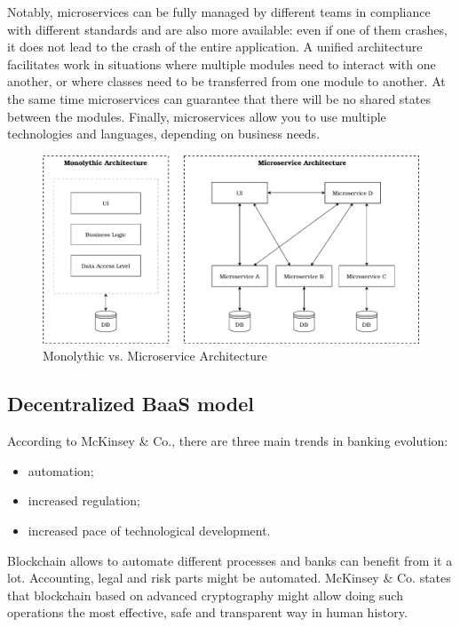 \documentclass{article}
\begin{document}
\begin{multicols}{2}
Notably, microservices can be fully managed by different teams in compliance with different standards and are also more available: even if one of them crashes, it does not lead to the crash of the entire application. A unified architecture facilitates work in situations where multiple modules need to interact with one another, or where classes need to be transferred from one module to another. At the same time microservices can guarantee that there will be no shared states between the modules. Finally, microservices allow you to use multiple technologies and languages, depending on business needs.

\begin{figure}
  \centering
  \includegraphics[width=\textwidth]{microservice-vs-monolyth.pdf}
  \caption{Monolythic vs. Microservice Architecture}
  \label{fig:microservice-vs-monolyth}
\end{figure}

\subsection{Decentralized BaaS model}

According to McKinsey \& Co., there are three main trends in banking evolution:
\begin{itemize}
\item automation;
\item increased regulation;
\item increased pace of technological development.
\end{itemize}

Blockchain allows to automate different processes and banks can benefit from it a lot. Accounting, legal and risk parts might be automated. McKinsey \& Co. states that blockchain based on advanced cryptography might allow doing such operations the most effective, safe and transparent way in human history.


\end{multicols}
\end{document}
